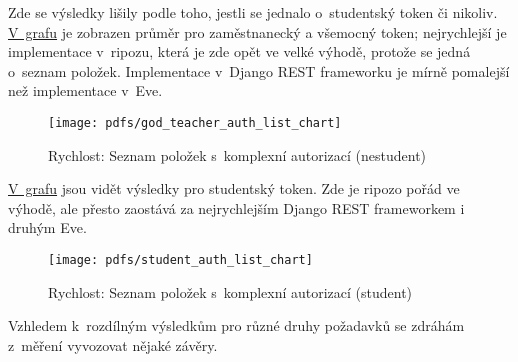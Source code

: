 Zde se výsledky lišily podle toho, jestli se jednalo o~studentský token či nikoliv. \protect\hyperlink{pic:god:teacher:auth:list:chart}{V~grafu} je zobrazen průměr pro zaměstnanecký a všemocný token; nejrychlejší je implementace v~ripozu, která je zde opět ve velké výhodě, protože se jedná o~seznam položek. Implementace v~Django REST frameworku je mírně pomalejší než implementace v~Eve.

\begin{figure}
\centering
\texttt{[image: pdfs/god\_teacher\_auth\_list\_chart]}
\caption{Rychlost: Seznam položek s~komplexní autorizací (nestudent)\label{pic:god:teacher:auth:list:chart}}
\end{figure}

\protect\hyperlink{pic:student:auth:list:chart}{V~grafu} jsou vidět výsledky pro studentský token. Zde je ripozo pořád ve výhodě, ale přesto zaostává za nejrychlejším Django REST frameworkem i druhým Eve.

\begin{figure}
\centering
\texttt{[image: pdfs/student\_auth\_list\_chart]}
\caption{Rychlost: Seznam položek s~komplexní autorizací (student)\label{pic:student:auth:list:chart}}
\end{figure}

Vzhledem k~rozdílným výsledkům pro různé druhy požadavků se zdráhám z~měření vyvozovat nějaké závěry.
